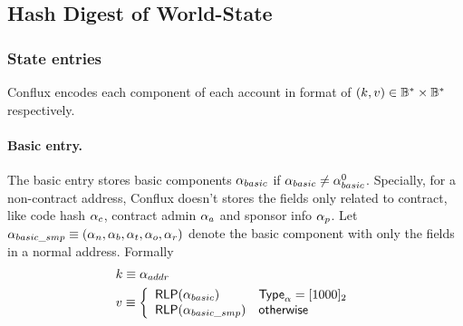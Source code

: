 \subsection{Hash Digest of World-State}

\subsubsection{State entries}

Conflux encodes each component of each account in format of $(k,v)\in \mathbb{B}^*\times \mathbb{B}^*$ respectively. 

\paragraph{Basic entry.} The basic entry stores basic components $\mathbf{\alpha}_{basic}$ if $\mathbf{\alpha}_{basic}\neq \mathbf{\alpha}^0_{basic}$. Specially, for a non-contract address, Conflux doesn't stores the fields only related to contract, like code hash $\mathbf{\alpha}_c$, contract admin $\mathbf{\alpha}_a$ and sponsor info $\mathbf{\alpha}_p$. Let $\mathbf{\alpha}_{basic\_smp}\equiv (\mathbf{\alpha}_n, \mathbf{\alpha}_b, \mathbf{\alpha}_t, \mathbf{\alpha}_o, \mathbf{\alpha}_r)$ denote the basic component with only the fields in a normal address. Formally
\begin{align}
	&k\equiv \alpha_{addr}\\
	&v\equiv \left\{\begin{array}{ll}
		\mathsf{RLP}(\mathbf{\alpha}_{basic}) & \mathsf{Type}_\alpha=[1000]_2 \\
		\mathsf{RLP}(\mathbf{\alpha}_{basic\_smp}) & \mathsf{otherwise}
	\end{array}\right.
\end{align}
	
	

